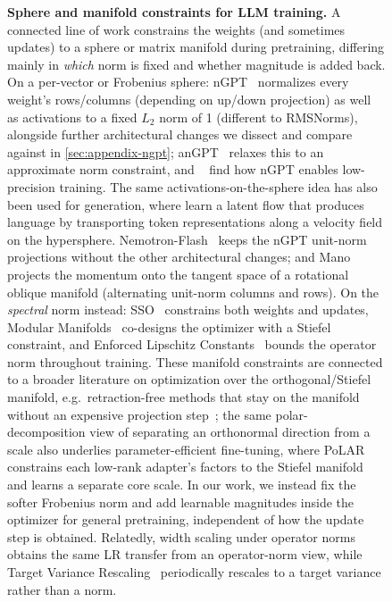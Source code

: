 \documentclass[10pt]{article} %
\begin{document}
\begin{figure}[t]
\textbf{Sphere and manifold constraints for LLM training.} A connected line of work constrains the weights (and sometimes updates) to a sphere or matrix manifold during pretraining, differing mainly in \emph{which} norm is fixed and whether magnitude is added back. On a per-vector or Frobenius sphere: nGPT~\citep{loshchilov2024ngpt} normalizes every weight's rows/columns (depending on up/down projection) as well as activations to a fixed $L_2$ norm of 1 (different to RMSNorms), alongside further architectural changes we dissect and compare against in \autoref{sec:appendix-ngpt}; anGPT~\citep{franke2025learning} relaxes this to an approximate norm constraint, and ~\citet{fishman2026normalized} find how nGPT enables low-precision training. The same activations-on-the-sphere idea has also been used for generation, where \citet{deschenaux2026hyperspherical} learn a latent flow that produces language by transporting token representations along a velocity field on the hypersphere. Nemotron-Flash~\citep{fu2025nemotron} keeps the nGPT unit-norm projections without the other architectural changes; and Mano~\citep{gu2026mano} projects the momentum onto the tangent space of a rotational oblique manifold (alternating unit-norm columns and rows). On the \emph{spectral} norm instead: SSO~\citep{xie2026controlled} constrains both weights and updates, Modular Manifolds~\citep{bernstein2025modular} co-designs the optimizer with a Stiefel constraint, and Enforced Lipschitz Constants~\citep{newhouse2025training} bounds the operator norm throughout training. These manifold constraints are connected to a broader literature on optimization over the orthogonal/Stiefel manifold, e.g.\ retraction-free methods that stay on the manifold without an expensive projection step~\citep{ablin2022fast}; the same polar-decomposition view of separating an orthonormal direction from a scale also underlies parameter-efficient fine-tuning, where PoLAR~\citep{lion2026polar} constrains each low-rank adapter's factors to the Stiefel manifold and learns a separate core scale. In our work, we instead fix the softer Frobenius norm and add learnable magnitudes inside the optimizer for general pretraining, independent of how the update step is obtained. Relatedly, width scaling under operator norms~\citep{xu2026width} obtains the same LR transfer from an operator-norm view, while Target Variance Rescaling~\citep{owen2025variance} periodically rescales to a target variance rather than a norm.


\end{figure}
\end{document}
